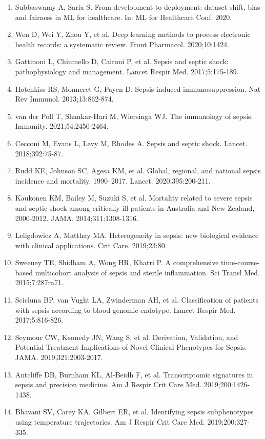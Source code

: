 \documentclass[11pt]{article}
\begin{document}
\begin{enumerate}
\item Subbaswamy A, Saria S. From development to deployment: dataset shift, bias and fairness in ML for healthcare. In: ML for Healthcare Conf. 2020.
\item Wen D, Wei Y, Zhou Y, et al. Deep learning methods to process electronic health records: a systematic review. Front Pharmacol. 2020;10:1424.
\item Gattinoni L, Chiumello D, Caironi P, et al. Sepsis and septic shock: pathophysiology and management. Lancet Respir Med. 2017;5:175-189.
\item Hotchkiss RS, Monneret G, Payen D. Sepsis-induced immunosuppression. Nat Rev Immunol. 2013;13:862-874.
\item van der Poll T, Shankar-Hari M, Wiersinga WJ. The immunology of sepsis. Immunity. 2021;54:2450-2464.
\item Cecconi M, Evans L, Levy M, Rhodes A. Sepsis and septic shock. Lancet. 2018;392:75-87.
\item Rudd KE, Johnson SC, Agesa KM, et al. Global, regional, and national sepsis incidence and mortality, 1990–2017. Lancet. 2020;395:200-211.
\item Kaukonen KM, Bailey M, Suzuki S, et al. Mortality related to severe sepsis and septic shock among critically ill patients in Australia and New Zealand, 2000-2012. JAMA. 2014;311:1308-1316.
\item Leligdowicz A, Matthay MA. Heterogeneity in sepsis: new biological evidence with clinical applications. Crit Care. 2019;23:80.
\item Sweeney TE, Shidham A, Wong HR, Khatri P. A comprehensive time-course-based multicohort analysis of sepsis and sterile inflammation. Sci Transl Med. 2015;7:287ra71.
\item Scicluna BP, van Vught LA, Zwinderman AH, et al. Classification of patients with sepsis according to blood genomic endotype. Lancet Respir Med. 2017;5:816-826.
\item Seymour CW, Kennedy JN, Wang S, et al. Derivation, Validation, and Potential Treatment Implications of Novel Clinical Phenotypes for Sepsis. JAMA. 2019;321:2003-2017.
\item Antcliffe DB, Burnham KL, Al-Beidh F, et al. Transcriptomic signatures in sepsis and precision medicine. Am J Respir Crit Care Med. 2019;200:1426-1438.
\item Bhavani SV, Carey KA, Gilbert ER, et al. Identifying sepsis subphenotypes using temperature trajectories. Am J Respir Crit Care Med. 2019;200:327-335.

\end{enumerate}
\end{document}
